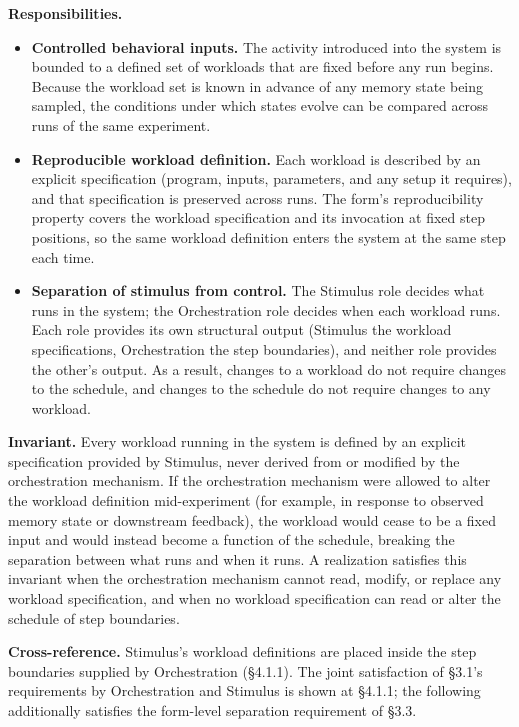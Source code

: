   \textbf{Responsibilities.}
  \begin{itemize}
    \item \textbf{Controlled behavioral inputs.} The activity introduced into the system is bounded to a defined set of workloads that are fixed before any run begins. Because the workload set is known in advance of any memory state being sampled, the conditions under which states evolve can be compared across runs of the same experiment.
    \item \textbf{Reproducible workload definition.} Each workload is described by an explicit specification (program, inputs, parameters, and any setup it requires), and that specification is preserved across runs. The form's reproducibility property covers the workload specification and its invocation at fixed step positions, so the same workload definition enters the system at the same step each time.
    \item \textbf{Separation of stimulus from control.} The Stimulus role decides what runs in the system; the Orchestration role decides when each workload runs. Each role provides its own structural output (Stimulus the workload specifications, Orchestration the step boundaries), and neither role provides the other's output. As a result, changes to a workload do not require changes to the schedule, and changes to the schedule do not require changes to any workload.
  \end{itemize}

  \textbf{Invariant.} Every workload running in the system is defined by an explicit specification provided by Stimulus, never derived from or modified by the orchestration mechanism. If the orchestration mechanism were allowed to alter the workload definition mid-experiment (for example, in response to observed memory state or downstream feedback), the workload would cease to be a fixed input and would instead become a function of the schedule, breaking the separation between what runs and when it runs. A realization satisfies this invariant when the orchestration mechanism cannot read, modify, or replace any workload specification, and when no workload specification can read or alter the schedule of step boundaries.

  \textbf{Cross-reference.} Stimulus's workload definitions are placed inside the step boundaries supplied by Orchestration (\S4.1.1). The joint satisfaction of \S3.1's requirements by Orchestration and Stimulus is shown at \S4.1.1; the following additionally satisfies the form-level separation requirement of \S3.3.

